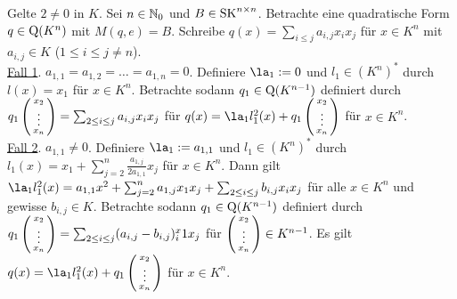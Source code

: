 \documentclass[../../main.tex]{subfiles}
\begin{document}
\begin{cproof}
Gelte $2\neq 0$ in $K$. Sei $n\in \mathbb N_0$ und $B\in \operatorname{SK}^{n\times n}$. Betrachte eine quadratische Form $q\in \operatorname{Q}(K^n)$ mit $M(q,e)=B$. Schreibe $q(x)=\sum_{i\le j} a_{i,j}x_ix_j$ für $x\in K^n$ mit $a_{i,j}\in K$ ($1\le i\le j\ne n$).\\
		
\noindent \underline{Fall 1}. $a_{1,1}=a_{1,2}=\ldots =a_{1,n}=0$. Definiere $\la_1:=0$ und $l_1\in (K^n)^*$ durch $l(x)=x_1$ für $x\in K^n$. Betrachte sodann $q_1\in \operatorname{Q}(K^{n-1})$ definiert durch $q_1\left(\begin{smallmatrix}x_2\\\vdots\\x_n\end{smallmatrix}\right)=\sum_{2\le i\le j} a_{i,j}x_ix_j$ für $q(x)=\la_1l_1^2(x)+q_1\cvec{x_2\\\vdots\\x_n}$ für $x\in K^n$.\\
	
\noindent\underline{Fall 2}. $a_{1,1}\neq 0$. Definiere $\la_1:=a_{1,1}$ und $l_1\in (K^n)^*$ durch $l_1(x)=x_1+\sum_{j=2}^n\frac{a_{1,j}}{2a_{1,1}}x_j$ für $x\in K^n$. Dann gilt $\la_1l_1^2(x)=a_{1,1}x^2+\sum_{j=2}^n a_{1,j}x_1x_j+\sum_{2\le i\le j}b_{i,j}x_ix_j$ für alle $x\in K^n$ und gewisse $b_{i,j}\in K$. Betrachte sodann $q_1\in \operatorname{Q}(K^{n-1})$ definiert durch $q_1\left(\begin{smallmatrix}x_2\\\vdots\\x_n\end{smallmatrix}\right)=\sum_{2\le i\le j} (a_{i,j}-b_{i,j})^x_i1x_j$ für $\left(\begin{smallmatrix}x_2\\\vdots\\x_n\end{smallmatrix}\right)\in K^{n-1}$. Es gilt $q(x)=\la_1l_1^2(x)+q_1\cvec{x_2\\\vdots\\x_n}$ für $x\in K^n$.\\
	

\end{cproof}
\end{document}
